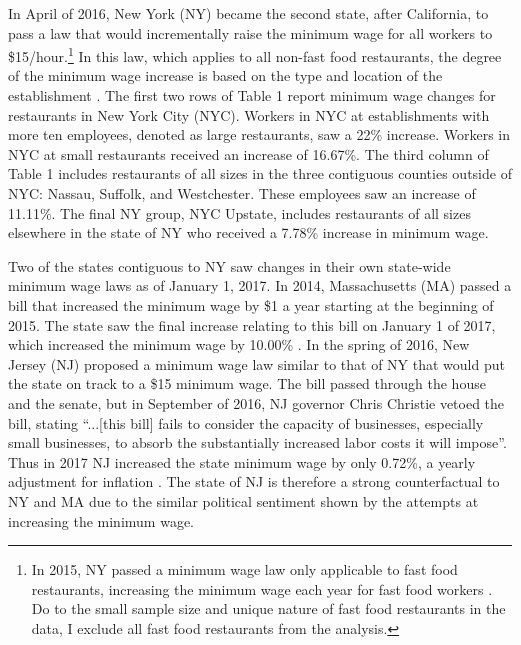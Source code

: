 \documentclass[11pt]{article}
\begin{document}
In April of 2016, New York (NY) became the second state, after California, to pass a law that would incrementally raise the minimum wage for all workers to \$15/hour.\footnote{In 2015, NY passed a minimum wage law only applicable to fast food restaurants, increasing the minimum wage each year for fast food workers \cite{nyff}. Do to the small sample size and unique nature of fast food restaurants in the data, I exclude all fast food restaurants from the analysis.} In this law, which applies to all non-fast food restaurants, the degree of the minimum wage increase is based on the type and location of the establishment \cite{nybill}. The first two rows of Table 1 report minimum wage changes for restaurants in New York City (NYC). Workers in NYC at establishments with more ten employees, denoted as large restaurants, saw a 22\% increase. Workers in NYC at small restaurants received an increase of 16.67\%. The third column of Table 1 includes restaurants of all sizes in the three contiguous counties outside of NYC: Nassau, Suffolk, and Westchester. These employees saw an increase of 11.11\%. The final NY group, NYC Upstate, includes restaurants of all sizes elsewhere in the state of NY who received a 7.78\% increase in minimum wage.

Two of the states contiguous to NY saw changes in their own state-wide minimum wage laws as of January 1, 2017. %
In 2014, Massachusetts (MA) passed a bill that increased the minimum wage by \$1 a year starting at the beginning of 2015. The state saw the final increase relating to this bill on January 1 of 2017, which increased the minimum wage by 10.00\% \cite{mabill}. %
In the spring of 2016, New Jersey (NJ) proposed a minimum wage law similar to that of NY that would put the state on track to a \$15 minimum wage. The bill passed through the house and the senate, but in September of 2016, NJ governor  Chris Christie vetoed the bill, stating ``...[this bill] fails to consider the capacity of businesses, especially small businesses, to absorb the substantially increased labor costs it will impose''\cite{njveto}. Thus in 2017 NJ increased the state minimum wage by only 0.72\%, a yearly adjustment for inflation \cite{njbill}. %
The state of NJ is therefore a strong counterfactual to NY and MA due to the similar political sentiment shown by the attempts at increasing the minimum wage. 
\end{document}
